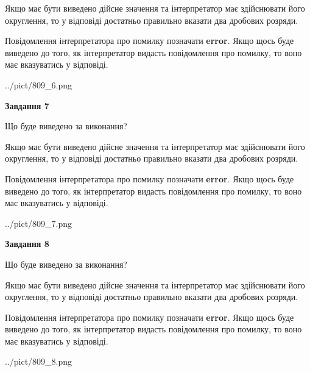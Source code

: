 \documentclass[12pt, ukrainian]{article}
\begin{document}
{\begin {Large}
Якщо має бути виведено дійсне значення та інтерпретатор має здійснювати його округлення, 
то у відповіді достатньо правильно вказати два дробових розряди.

Повідомлення інтерпретатора про помилку позначати \textbf{error}.
Якщо щось буде виведено до того, як інтерпретатор видасть повідомлення про помилку, 
то воно має вказуватись у відповіді. \par

\begin{center}
	{../pict/809_6.png}
\end{center}
\newpage

{\begin {center}\textbf{Завдання 7}\end {center}}\par
Що буде виведено за виконання? \par

Якщо має бути виведено дійсне значення та інтерпретатор має здійснювати його округлення, 
то у відповіді достатньо правильно вказати два дробових розряди.

Повідомлення інтерпретатора про помилку позначати \textbf{error}.
Якщо щось буде виведено до того, як інтерпретатор видасть повідомлення про помилку, 
то воно має вказуватись у відповіді. \par

\begin{center}
	{../pict/809_7.png}
\end{center}
\newpage

{\begin {center}\textbf{Завдання 8}\end {center}}\par
Що буде виведено за виконання? \par

Якщо має бути виведено дійсне значення та інтерпретатор має здійснювати його округлення, 
то у відповіді достатньо правильно вказати два дробових розряди.

Повідомлення інтерпретатора про помилку позначати \textbf{error}.
Якщо щось буде виведено до того, як інтерпретатор видасть повідомлення про помилку, 
то воно має вказуватись у відповіді. \par

\begin{center}
	{../pict/809_8.png}
\end{center}
\newpage


\end{Large}}
\end{document}
